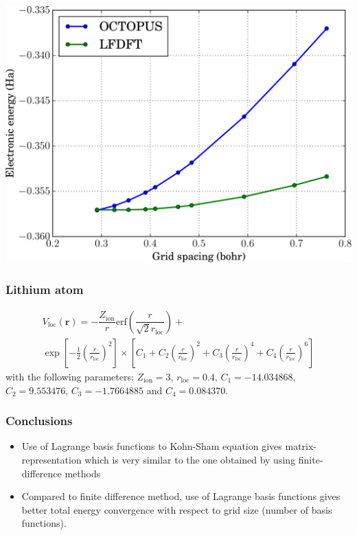 \documentclass[10pt]{beamer}
\begin{document}
\begin{frame}[plain]
  
{\centering
\includegraphics[width=\textwidth]{images/atom_H.pdf}
}
  
\end{frame}


\begin{frame}
\frametitle{Lithium atom}

\begin{multline*}
V_{\mathrm{loc}}(\mathbf{r}) = 
-\dfrac{Z_{\mathrm{ion}}}{r}
\mathrm{erf}\left(
\dfrac{r}{\sqrt{2}r_{\mathrm{loc}}}
\right) + \\
\exp
\left[ -\frac{1}{2}
\left( \frac{r}{r_{\mathrm{loc}}}\right)^2
\right]
\times
\left[
C_{1} +
C_{2}\left( \frac{r}{r_{\mathrm{loc}}}\right)^2 +
C_{3}\left( \frac{r}{r_{\mathrm{loc}}}\right)^4 +
C_{4}\left( \frac{r}{r_{\mathrm{loc}}}\right)^6
\right]
\end{multline*}
with the following parameters:
$Z_{\mathrm{ion}} = 3$, $r_{\mathrm{loc}} = 0.4$,
$C_{1} = -14.034868$, $C_{2} = 9.553476$, $C_{3} = -1.7664885$
and $C_{4} = 0.084370$.

\end{frame}


\begin{frame}[t]
\frametitle{Conclusions}

\begin{itemize}
\item Use of Lagrange basis functions to Kohn-Sham equation gives
matrix-representation which is very similar to the one obtained by
using finite-difference methods
\item Compared to finite difference method, use of Lagrange basis functions
gives better total energy convergence with respect to grid size (number of basis
functions).
\end{itemize}

\end{frame}
\end{document}

